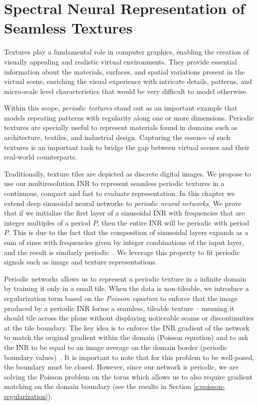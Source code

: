 \chapter{Spectral Neural Representation of Seamless Textures}

Textures play a fundamental role in computer graphics, enabling the creation of visually appealing and realistic virtual environments. They provide essential information about the materials, surfaces, and spatial variations present in the virtual scene, enriching the visual experience with intricate details, patterns, and micro-scale level characteristics that would be very difficult to model otherwise.

Within this scope, \textit{periodic textures} stand out as an important example that models repeating patterns with regularity along one or more dimensions. Periodic textures are specially useful to represent materials found in domains such as architecture, textiles, and industrial design. Capturing the essence of such textures is an important task to bridge the gap between virtual scenes and their real-world counterparts.


Traditionally, texture tiles are depicted as discrete digital images. We propose to use our multiresolution INR to represent seamless periodic textures in a continuous, compact and fast to evaluate representation. In this chapter we extend deep sinusoidal neural networks to \textit{periodic neural networks}. We prove that if we initialize the first layer of a sinusoidal INR with frequencies that are integer multiples of a period $P$, then the entire INR will be periodic with period $P$.  This is due to the fact that the composition of sinusoidal layers expands as a sum of sines with frequencies given by integer combinations of the input layer, and the result is similarly periodic~\citep{novello2022understanding, yuce2022structured}. We leverage this property to fit periodic signals such as image and texture representations.


Periodic networks allows us to represent a periodic texture in a infinite domain by training it only in a small tile. When the data is non-tileable, we introduce a regularization term based on the \textit{Poisson equation} to enforce that the image produced by a periodic INR forms a seamless, tileable texture -- meaning it should tile across the plane without displaying noticeable seams or discontinuities at the tile boundary. The key idea is to enforce the INR gradient of the network to match the original gradient within the domain (Poisson equation) and to ask the INR to be equal to an image average on the domain border (periodic boundary values)~\cite{perez2003}. It is important to note that for this problem to be well-posed, the boundary must be closed. However, since our network is periodic, we are solving the Poisson problem on the torus which allows us to also require gradient matching on the domain boundary (see the results in Section \ref{s:poisson-regularization}).

